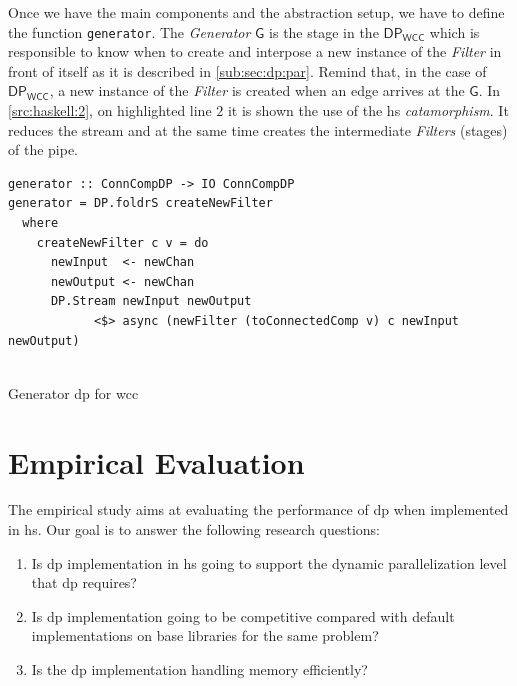 \documentclass[preprint]{elsarticle}
\newcommand{\dpwcc}{\mathsf{DP_{WCC}}}
\newcommand{\gwcc}{\mathsf{G}}
\begin{document}
Once we have the main components and the abstraction setup, we have to define the function \texttt{generator}. The \textit{Generator} $\gwcc$ is the stage in the $\dpwcc$ which is responsible to know when to create and interpose a new instance of the \textit{Filter} in front of itself as it is described in \autoref{sub:sec:dp:par}. Remind that, in the case of $\dpwcc$, a new instance of the \textit{Filter} is created when an edge arrives at the $\gwcc$. In \autoref{src:haskell:2}, on highlighted line $2$ it is shown the use of the \acrshort{hs} \textit{catamorphism}. It reduces the stream and at the same time creates the intermediate \textit{Filters} (stages) of the pipe.

\begin{listing}[H]
\begin{verbatim}
generator :: ConnCompDP -> IO ConnCompDP
generator = DP.foldrS createNewFilter
  where
    createNewFilter c v = do
      newInput  <- newChan
      newOutput <- newChan
      DP.Stream newInput newOutput 
            <$> async (newFilter (toConnectedComp v) c newInput newOutput)
  
  \end{verbatim}
  \caption{Generator \acrshort{dp} for \acrshort{wcc}}
  \label{src:haskell:2}
\end{listing}

\section{Empirical Evaluation}
The empirical study aims at evaluating the performance of \acrshort{dp} when implemented in \acrshort{hs}. 
Our goal is to answer the following research questions: 

\begin{enumerate}[Q1.]\label{res:question}
    \item Is \acrshort{dp} implementation in \acrshort{hs} going to support the dynamic parallelization level that \acrshort{dp} requires?
    \item Is \acrshort{dp} implementation going to be competitive compared with default implementations on base libraries for the same problem?
    \item Is the \acrshort{dp} implementation handling memory efficiently?
\end{enumerate}
\end{document}
